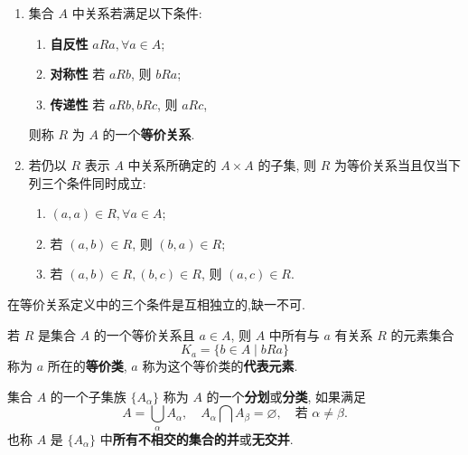 \documentclass[../../main.tex]{subfiles}
\begin{document}
\begin{definition}[等价关系]
\begin{enumerate}
\item 集合 \( A \) 中关系若满足以下条件:
\begin{enumerate}[(1)]
\item \textbf{自反性} \( aRa, \forall a \in A \);

\item \textbf{对称性} 若 \( aRb \), 则 \( bRa \);

\item \textbf{传递性} 若 \( aRb, bRc \), 则 \( aRc \),
\end{enumerate}
则称 \( R \) 为 \( A \) 的一个\textbf{等价关系}.

\item 若仍以 \( R \) 表示 \( A \) 中关系所确定的 \( A \times A \) 的子集, 则 \( R \) 为等价关系当且仅当下列三个条件同时成立:
\begin{enumerate}[(1)]
\item \( (a,a) \in R, \forall a \in A \);

\item 若 \( (a,b) \in R \), 则 \( (b,a) \in R \);

\item 若 \( (a,b) \in R, (b,c) \in R \), 则 \( (a,c) \in R \).
\end{enumerate}
\end{enumerate}
\end{definition}
\begin{remark}
在等价关系定义中的三个条件是互相独立的,缺一不可.
\end{remark}

\begin{definition}[等价类和代表元素]
若 \( R \) 是集合 \( A \) 的一个等价关系且 \( a \in A \), 则 \( A \) 中所有与 \( a \) 有关系 \( R \) 的元素集合
\[
K_a = \{ b \in A \mid bRa \}
\]
称为 \( a \) 所在的\textbf{等价类}, \( a \) 称为这个等价类的\textbf{代表元素}.
\end{definition}

\begin{definition}[分划/分类]
集合 \( A \) 的一个子集族 \( \{ A_\alpha \} \) 称为 \( A \) 的一个\textbf{分划}或\textbf{分类}, 如果满足
\[
A = \bigcup_\alpha A_\alpha,\quad A_\alpha \bigcap A_\beta = \varnothing,\quad \text{若 } \alpha \neq \beta.
\]
也称 \( A \) 是 \( \{ A_\alpha \} \) 中\textbf{所有不相交的集合的并}或\textbf{无交并}.
\end{definition}
\end{document}
